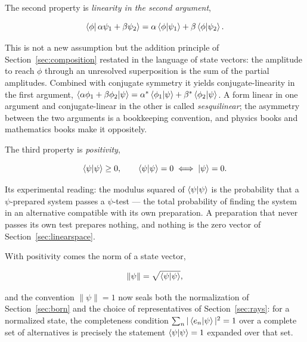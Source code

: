 The second property is \emph{linearity in the second argument},
\begin{linenomath}
\begin{equation}
    \braket{\phi|\,\alpha\psi_1+\beta\psi_2}
    =
    \alpha\braket{\phi|\psi_1}+\beta\braket{\phi|\psi_2} .
    \label{eq:ip-linearity}
\end{equation}
\end{linenomath}
This is not a new assumption but the addition principle of Section~\ref{sec:composition} restated in the language of state vectors: the amplitude to reach $\phi$ through an unresolved superposition is the sum of the partial amplitudes. Combined with conjugate symmetry it yields conjugate-linearity in the first argument, $\braket{\alpha\phi_1+\beta\phi_2|\psi}=\alpha^{*}\braket{\phi_1|\psi}+\beta^{*}\braket{\phi_2|\psi}$. A form linear in one argument and conjugate-linear in the other is called \emph{sesquilinear}; the asymmetry between the two arguments is a bookkeeping convention, and physics books and mathematics books make it oppositely.

The third property is \emph{positivity},
\begin{linenomath}
\begin{equation}
    \braket{\psi|\psi}\geq 0,
    \qquad
    \braket{\psi|\psi}=0
    \iff
    \ket{\psi}=0 .
    \label{eq:ip-positivity}
\end{equation}
\end{linenomath}
Its experimental reading: the modulus squared of $\braket{\psi|\psi}$ is the probability that a $\psi$-prepared system passes a $\psi$-test --- the total probability of finding the system in an alternative compatible with its own preparation. A preparation that never passes its own test prepares nothing, and nothing is the zero vector of Section~\ref{sec:linearspace}.

With positivity comes the norm of a state vector,
\begin{linenomath}
\begin{equation}
    \|\psi\|=\sqrt{\braket{\psi|\psi}},
\end{equation}
\end{linenomath}
and the convention $\|\psi\|=1$ now seals both the normalization of Section~\ref{sec:born} and the choice of representatives of Section~\ref{sec:rays}: for a normalized state, the completeness condition $\sum_n|\braket{e_n|\psi}|^2=1$ over a complete set of alternatives is precisely the statement $\braket{\psi|\psi}=1$ expanded over that set.

